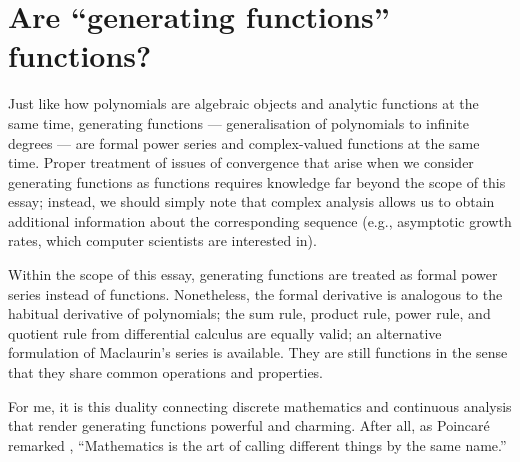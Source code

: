 \documentclass[a4paper, 12pt]{report}
\begin{document}
\section{Are ``generating functions'' functions?}
Just like how polynomials are algebraic objects and analytic functions at the same time, generating functions --- generalisation of polynomials to infinite degrees --- are formal power series and complex-valued functions at the same time. Proper treatment of issues of convergence that arise when we consider generating functions as functions requires knowledge far beyond the scope of this essay; instead, we should simply note that complex analysis allows us to obtain additional information about the corresponding sequence (e.g., asymptotic growth rates, which computer scientists are interested in). 

Within the scope of this essay, generating functions are treated as formal power series instead of functions. Nonetheless, the formal derivative is analogous to the habitual derivative of polynomials; the sum rule, product rule, power rule, and quotient rule from differential calculus are equally valid; an alternative formulation of Maclaurin's series is available. They are still functions in the sense that they share common operations and properties.

For me, it is this duality connecting discrete mathematics and continuous analysis that render generating functions powerful and charming. After all, as Poincaré remarked \autocite[1]{zorich}, ``Mathematics is the art of calling different things by the same name.''

\nocite{*}
{\let\clearpage\relax
\printbibliography[keyword={consulted}, title={Further Reading}]
}
\printbibliography[keyword={cited}, title={Works Cited}]

\thispagestyle{empty}
\end{document}
